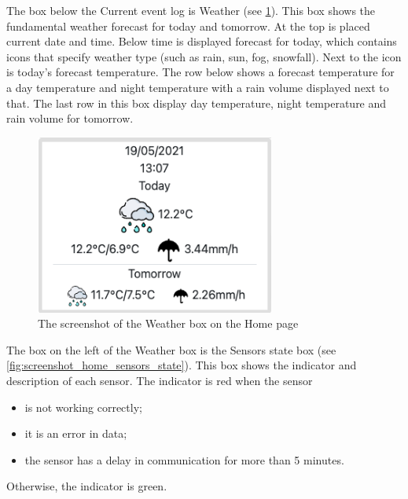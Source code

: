 The box below the Current event log is Weather (see \cref{fig:screenshot_home_weather}). This box shows the fundamental weather forecast for today and tomorrow. At the top is placed current date and time. Below time is displayed forecast for today, which contains icons that specify weather type (such as rain, sun, fog, snowfall). Next to the icon is today's forecast temperature. The row below shows a forecast temperature for a day temperature and night temperature with a rain volume displayed next to that. The last row in this box display day temperature, night temperature and rain volume for tomorrow.

\begin{figure}[H]
    \centering
    \includegraphics[width=0.7\textwidth]{img/screenshot_home_weather.png}
    \caption{The screenshot of the Weather box on the Home page}
    \label{fig:screenshot_home_weather}
\end{figure}

The box on the left of the Weather box is the Sensors state box (see \cref{fig:screenshot_home_sensors_state}). This box shows the indicator and description of each sensor. The indicator is red when the sensor

\begin{itemize}
    \item is not working correctly;
    \item it is an error in data;
    \item the sensor has a delay in communication for more than 5 minutes.
\end{itemize}

Otherwise, the indicator is green.


